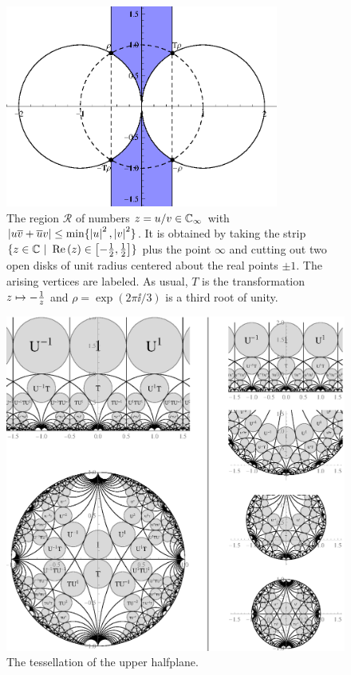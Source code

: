\begin{figure}
\centering
\includegraphics[width=0.8\textwidth]{figures/minimal-region}
\caption{The region $\mathcal{R}$ of numbers $z = u/v \in \mathbb{C}_{\infty}$ with $\left|u\overline{v} + \overline{u}v\right| \le \min\{\left|u\right|^2,\left|v\right|^2\}$. It is obtained by taking the strip $\{ z \in \mathbb{C} \ | \ \operatorname{Re}\left(z\right) \in \left[-\frac{1}{2},\frac{1}{2}\right] \}$ plus the point $\infty$ and cutting out two open disks of unit radius centered about the real points $\pm 1$. The arising vertices are labeled. As usual, $T$ is the transformation $z \mapsto -\frac{1}{z}$ and $\rho = \exp(2 \pi \ii / 3)$ is a third root of unity.}
\label{fig_SL2FunDomMinRegion}
\end{figure}

\begin{figure}
\centering
\includegraphics[width=\textwidth]{figures/modular-tiling-1}
\caption{The tessellation of the upper halfplane.}
\label{fig_ModularTiling}
\end{figure}
